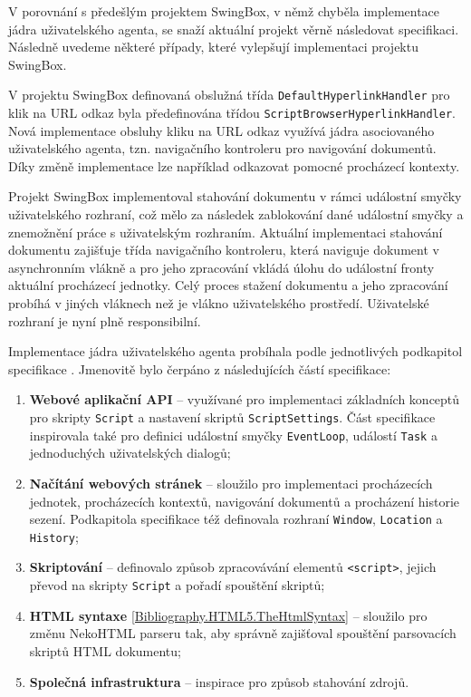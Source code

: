 V porovnání s předešlým projektem SwingBox, v němž chyběla implementace jádra uživatelského agenta, se snaží aktuální projekt věrně následovat specifikaci. Následně uvedeme některé případy, které vylepšují implementaci projektu SwingBox. 
 
V projektu SwingBox definovaná obslužná třída \texttt{DefaultHyperlinkHandler} pro klik na URL odkaz byla předefinována třídou \texttt{ScriptBrowserHyperlinkHandler}. Nová implementace obsluhy kliku na URL odkaz využívá jádra asociovaného uživatelského agenta, tzn. navigačního kontroleru pro navigování dokumentů. Díky změně implementace lze například odkazovat pomocné procházecí kontexty.

Projekt SwingBox implementoval stahování dokumentu v rámci událostní smyčky uživatelského rozhraní, což mělo za následek zablokování dané událostní smyčky a znemožnění práce s uživatelským rozhraním. Aktuální implementaci stahování dokumentu zajišťuje třída navigačního kontroleru, která naviguje dokument v asynchronním vlákně a pro jeho zpracování vkládá úlohu do událostní fronty aktuální procházecí jednotky. Celý proces stažení dokumentu a jeho zpracování probíhá v jiných vláknech než je vlákno uživatelského prostředí. Uživatelské rozhraní je nyní plně responsibilní.  

Implementace jádra uživatelského agenta probíhala podle jednotlivých podkapitol specifikace \cite{Bibliography.HTML5.TableOfContents}. Jmenovitě bylo čerpáno z následujících částí specifikace:

\begin{enumerate}
  \item \textbf{Webové aplikační API} \cite{Bibliography.HTML5.WebAPIs} -- využívané pro implementaci základních konceptů pro skripty \texttt{Script} a nastavení skriptů \texttt{ScriptSettings}. Část specifikace inspirovala také pro definici událostní smyčky \texttt{EventLoop}, událostí \texttt{Task} a jednoduchých uživatelských dialogů;
  \item \textbf{Načítání webových stránek} \cite{Bibliography.HTML5.Browsers} -- sloužilo pro implementaci procházecích jednotek, procházecích kontextů, navigování dokumentů a procházení historie sezení. Podkapitola specifikace též definovala rozhraní \texttt{Window}, \texttt{Location} a \texttt{History};
  \item \textbf{Skriptování} \cite{Bibliography.HTML5.Scripting} -- definovalo způsob zpracovávání elementů \texttt{<script>}, jejich převod na skripty \texttt{Script} a pořadí spouštění skriptů;
  \item \textbf{HTML syntaxe} \ref{Bibliography.HTML5.TheHtmlSyntax} -- sloužilo pro změnu NekoHTML parseru tak, aby správně zajišťoval spouštění parsovacích skriptů HTML dokumentu;
  \item \textbf{Společná infrastruktura} \cite{Bibliography.HTML5.Commoninfrastructure} -- inspirace pro způsob stahování zdrojů.
\end{enumerate}

